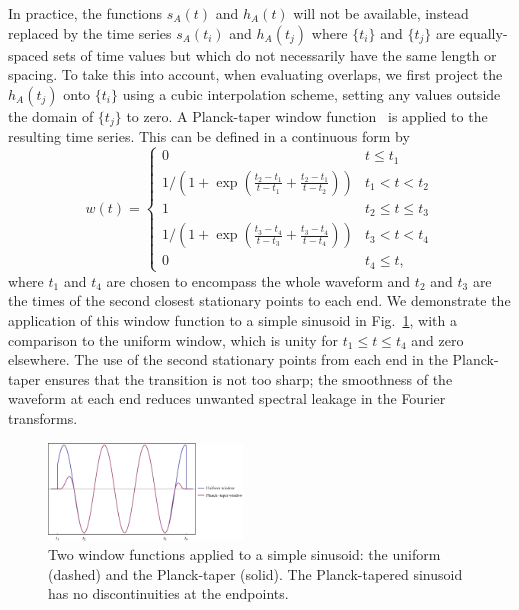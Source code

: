 \documentclass[aps,prd,amsfonts,amssymb,amsmath,nofootinbib,reprint,showpacs,superscriptaddress,twocolumn]{revtex4}
\newcommand{\figref}[1]{Fig.\ \ref{fig:#1}}
\begin{document}
In practice, the functions $s_A(t)$ and $h_A(t)$ will not be available, instead replaced by the time series $s_A(t_i)$ and $h_A(t_j)$ where $\{t_i\}$ and $\{t_j\}$ are equally-spaced sets of time values but which do not necessarily have the same length or spacing. To take this into account, when evaluating overlaps, we first project the $h_A(t_j)$ onto $\{t_i\}$ using a cubic interpolation scheme, setting any values outside the domain of $\{t_j\}$ to zero. A Planck-taper window function~\cite{McKechan2010} is applied to the resulting time series. This can be defined in a continuous form by
\begin{equation}
w(t) = \left\{
\begin{array}{ll}
	0 & t\leq t_1 \\
	1\big/\left(1+\exp\left(\frac{t_2-t_1}{t-t_1}+\frac{t_2-t_1}{t-t_2}\right)\right) & t_1 < t < t_2 \\
	1 & t_2\leq t\leq t_3 \\
	1\big/\left(1+\exp\left(\frac{t_3-t_4}{t-t_3}+\frac{t_3-t_4}{t-t_4}\right)\right) & t_3 < t < t_4 \\
	0 & t_4\leq t,
\end{array}\right.
\end{equation}
where $t_1$ and $t_4$ are chosen to encompass the whole waveform and $t_2$ and $t_3$ are the times of the second closest stationary points to each end. We demonstrate the application of this window function to a simple sinusoid in \figref{window-func}, with a comparison to the uniform window, which is unity for $t_1\leq t\leq t_4$ and zero elsewhere. The use of the second stationary points from each end in the Planck-taper ensures that the transition is not too sharp; the smoothness of the waveform at each end reduces unwanted spectral leakage in the Fourier transforms.

\begin{figure}[htbp]
\centering
\includegraphics[width=0.46\textwidth]{Fig_window_func}
\caption{\label{fig:window-func}Two window functions applied to a simple sinusoid: the uniform (dashed) and the Planck-taper (solid). The Planck-tapered sinusoid has no discontinuities at the endpoints.}
\end{figure}
\end{document}

